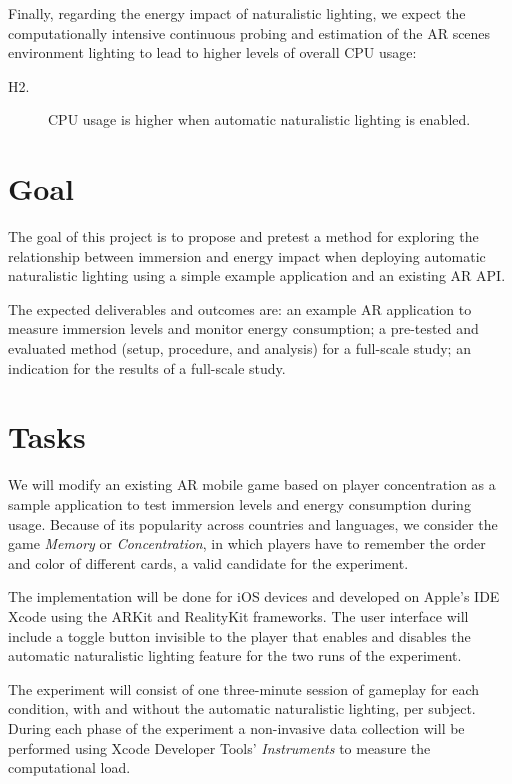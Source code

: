 \documentclass[12pt,twoside,english]{article}
\begin{document}
Finally, regarding the energy impact of naturalistic lighting, we expect the computationally intensive continuous probing and estimation of the \gls{AR} scenes environment lighting to lead to higher levels of overall \gls{CPU} usage:

\begin{description}
    \item[H2.] \gls{CPU} usage is higher when automatic naturalistic lighting is enabled.
\end{description}





\section{Goal}
\label{sect:goals}

The goal of this project is to propose and pretest a method for exploring the relationship between immersion and energy impact when deploying automatic naturalistic lighting using a simple example application and an existing \gls{AR} \gls{API}.

The expected deliverables and outcomes are: an example \gls{AR} application to measure immersion levels and monitor energy consumption; a pre-tested and evaluated method (setup, procedure, and analysis) for a full-scale study; an indication for the results of a full-scale study.

\section{Tasks}
\label{sect:tasks}

We will modify an existing \gls{AR} mobile game based on player concentration as a sample application to test immersion levels and energy consumption during usage.
Because of its popularity across countries and languages, we consider the game \textit{Memory} or \textit{Concentration}, in which players have to remember the order and color of different cards, a valid candidate for the experiment.

The implementation will be done for iOS devices and developed on Apple's \gls{IDE} Xcode using the ARKit and RealityKit frameworks.
The user interface will include a toggle button invisible to the player that enables and disables the automatic naturalistic lighting feature for the two runs of the experiment.

The experiment will consist of one three-minute session of gameplay for each condition, with and without the automatic naturalistic lighting, per subject.
During each phase of the experiment a non-invasive data collection will be performed using Xcode Developer Tools' \emph{Instruments} to measure the computational load.
\end{document}
